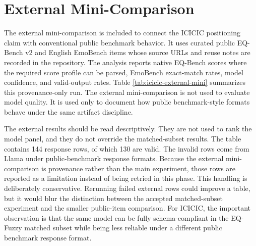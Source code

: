 \documentclass[12pt,a4paper]{icicel}
\begin{document}
\begin{table}[t]
\centering
\footnotesize
\caption{Valid-output rate by model and target mode generated from the stable6 matched subset.}
\label{tab:icicic-valid-output}
{\tiny\setlength{\tabcolsep}{2pt}}
\end{table}

\section{External Mini-Comparison}
The external mini-comparison is included to connect the ICICIC positioning
claim with conventional public benchmark behavior.
It uses curated public EQ-Bench v2 and English EmoBench items whose source
URLs and reuse notes are recorded in the repository.
The analysis reports native EQ-Bench scores where the required score profile
can be parsed, EmoBench exact-match rates, model confidence, and valid-output
rates.
Table \ref{tab:icicic-external-mini} summarizes this provenance-only run.
The external mini-comparison is not used to evaluate model quality.
It is used only to document how public benchmark-style formats behave under
the same artifact discipline.

The external results should be read descriptively.
They are not used to rank the model panel, and they do not override the
matched-subset results.
The table contains 144 response rows, of which 130 are valid.
The invalid rows come from Llama under public-benchmark response formats.
Because the external mini-comparison is provenance rather than the main
experiment, those rows are reported as a limitation instead of being retried in
this phase.
This handling is deliberately conservative.
Rerunning failed external rows could improve a table, but it would blur the
distinction between the accepted matched-subset experiment and the smaller
public-item comparison.
For ICICIC, the important observation is that the same model can be fully
schema-compliant in the EQ-Fuzzy matched subset while being less reliable under
a different public benchmark response format.

\begin{table}[t]
\centering
\footnotesize
\caption{External mini-comparison summary generated from curated public benchmark items; provenance only, not a model-quality ranking.}
\label{tab:icicic-external-mini}
{\tiny\setlength{\tabcolsep}{1pt}}
\end{table}
\end{document}
